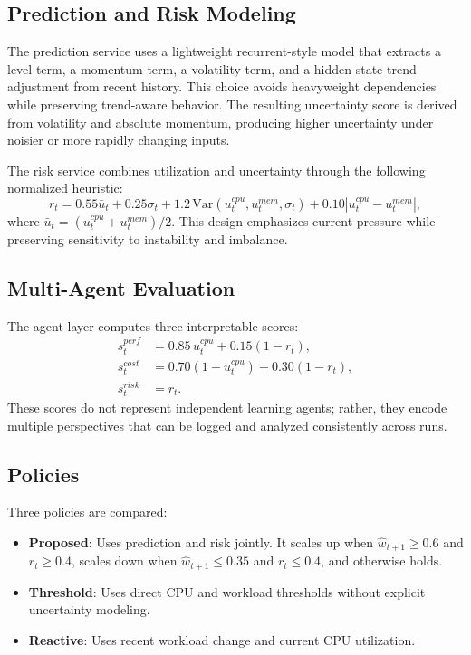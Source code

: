 \documentclass[conference]{IEEEtran}
\begin{document}
\subsection{Prediction and Risk Modeling}
The prediction service uses a lightweight recurrent-style model that extracts a level term, a momentum term, a volatility term, and a hidden-state trend adjustment from recent history. This choice avoids heavyweight dependencies while preserving trend-aware behavior. The resulting uncertainty score is derived from volatility and absolute momentum, producing higher uncertainty under noisier or more rapidly changing inputs.

The risk service combines utilization and uncertainty through the following normalized heuristic:
\begin{equation}
r_t = 0.55\bar{u}_t + 0.25\sigma_t + 1.2\,\mathrm{Var}(u_t^{cpu},u_t^{mem},\sigma_t) + 0.10|u_t^{cpu} - u_t^{mem}|,
\label{eq:risk}
\end{equation}
where $\bar{u}_t = (u_t^{cpu} + u_t^{mem}) / 2$. This design emphasizes current pressure while preserving sensitivity to instability and imbalance.

\subsection{Multi-Agent Evaluation}
The agent layer computes three interpretable scores:
\begin{align}
s_t^{perf} &= 0.85\,u_t^{cpu} + 0.15(1-r_t), \\
s_t^{cost} &= 0.70(1-u_t^{cpu}) + 0.30(1-r_t), \\
s_t^{risk} &= r_t.
\end{align}
These scores do not represent independent learning agents; rather, they encode multiple perspectives that can be logged and analyzed consistently across runs.

\subsection{Policies}
Three policies are compared:
\begin{itemize}[leftmargin=*]
\item \textbf{Proposed}: Uses prediction and risk jointly. It scales up when $\hat{w}_{t+1} \geq 0.6$ and $r_t \geq 0.4$, scales down when $\hat{w}_{t+1} \leq 0.35$ and $r_t \leq 0.4$, and otherwise holds.
\item \textbf{Threshold}: Uses direct CPU and workload thresholds without explicit uncertainty modeling.
\item \textbf{Reactive}: Uses recent workload change and current CPU utilization.
\end{itemize}
\end{document}
